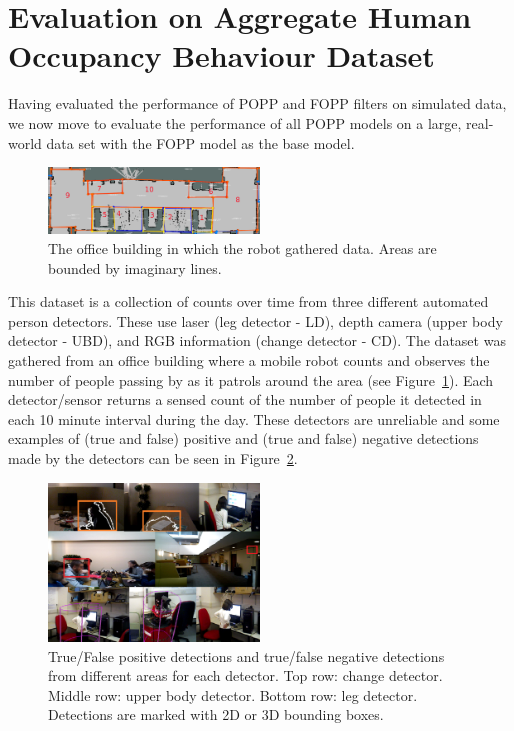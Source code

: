 \section{Evaluation on Aggregate Human Occupancy Behaviour Dataset}
\label{sec:evareal}

Having evaluated the performance of POPP and FOPP filters on simulated data, we now move to evaluate the performance of all POPP models on a large, real-world data set with the FOPP model as the base model.

\begin{figure}[t]
	\centering
    \includegraphics[width=0.5\textwidth]{./figures/map_popp.png}
    \caption{The office building in which the robot gathered data. Areas are bounded by imaginary lines.}
    \label{fig:map_popp_independent_test}
\end{figure}

This dataset is a collection of counts over time from three different automated person detectors. These use laser (leg detector - LD), depth camera (upper body detector - UBD), and RGB information (change detector - CD). The dataset was gathered from an office building where a mobile robot counts and observes the number of people passing by as it patrols around the area (see Figure~\ref{fig:map_popp_independent_test}). Each detector/sensor returns a sensed count of the number of people it detected in each 10 minute interval during the day. These detectors are unreliable and some examples of (true and false) positive and (true and false) negative detections made by the detectors can be seen in Figure~\ref{fig:sensor_images}.

\begin{figure}[t]
	\centering
	\includegraphics[width=0.5\textwidth]{./figures/sensor_images.png}
	\caption{True/False positive detections and true/false negative detections from different areas for each detector. Top row: change detector. Middle row: upper body detector. Bottom row: leg detector. Detections are marked with 2D or 3D bounding boxes.}
    \label{fig:sensor_images}
\end{figure}

